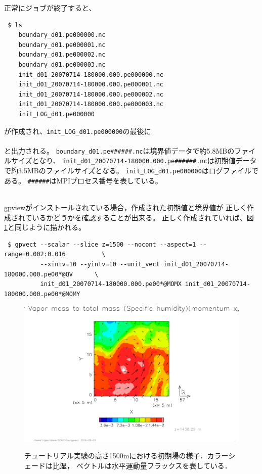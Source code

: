 正常にジョブが終了すると、
\begin{verbatim}
 $ ls
    boundary_d01.pe000000.nc
    boundary_d01.pe000001.nc
    boundary_d01.pe000002.nc
    boundary_d01.pe000003.nc
    init_d01_20070714-180000.000.pe000000.nc
    init_d01_20070714-180000.000.pe000001.nc
    init_d01_20070714-180000.000.pe000002.nc
    init_d01_20070714-180000.000.pe000003.nc
    init_LOG_d01.pe000000
\end{verbatim}
が作成され、\verb|init_LOG_d01.pe000000|の最後に\\

\\

\noindent
と出力される。
\verb|boundary_d01.pe######.nc|は境界値データで約5.8MBのファイルサイズとなり、
\verb|init_d01_20070714-180000.000.pe######.nc|は初期値データで約3.5MBのファイルサイズとなる。
\verb|init_LOG_d01.pe000000|はログファイルである。
\verb|######|はMPIプロセス番号を表している。


\vspace{1cm}
 \hrulefill \\
gpviewがインストールされている場合，作成された初期値と境界値が
正しく作成されているかどうかを確認することが出来る。
正しく作成されていれば、図 \ref{fig:init}と同じように描かれる。

\begin{verbatim}
 $ gpvect --scalar --slice z=1500 --nocont --aspect=1 --range=0.002:0.016          \
          --xintv=10 --yintv=10 --unit_vect init_d01_20070714-180000.000.pe00*@QV      \
          init_d01_20070714-180000.000.pe00*@MOMX init_d01_20070714-180000.000.pe00*@MOMY
\end{verbatim}


\begin{figure}[h]
\begin{center}
  \includegraphics[width=0.9\hsize]{./figure/real_init_qv-momxy.eps}\\
  \caption{チュートリアル実験の高さ1500mにおける初期場の様子．カラーシェードは比湿，
           ベクトルは水平運動量フラックスを表している．}
  \label{fig:init}
\end{center}
\end{figure}

